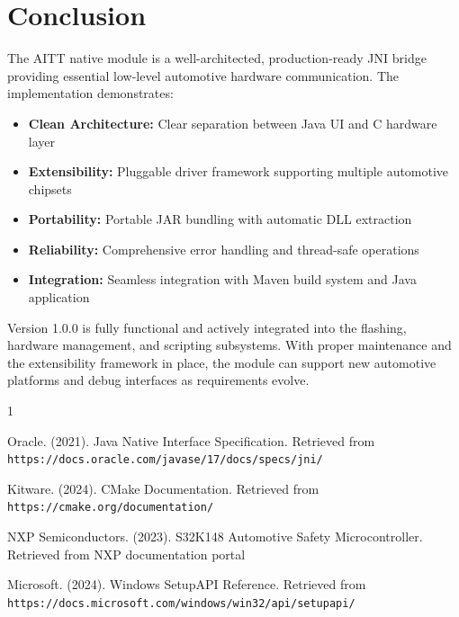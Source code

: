 \documentclass[12pt,a4paper]{article}
\begin{document}
\newpage

\section{Conclusion}

The AITT native module is a well-architected, production-ready JNI bridge providing essential low-level automotive hardware communication. The implementation demonstrates:

\begin{itemize}
    \item \textbf{Clean Architecture:} Clear separation between Java UI and C hardware layer
    \item \textbf{Extensibility:} Pluggable driver framework supporting multiple automotive chipsets
    \item \textbf{Portability:} Portable JAR bundling with automatic DLL extraction
    \item \textbf{Reliability:} Comprehensive error handling and thread-safe operations
    \item \textbf{Integration:} Seamless integration with Maven build system and Java application
\end{itemize}

Version 1.0.0 is fully functional and actively integrated into the flashing, hardware management, and scripting subsystems. With proper maintenance and the extensibility framework in place, the module can support new automotive platforms and debug interfaces as requirements evolve.

\newpage

\begin{thebibliography}{1}

 Oracle. (2021). Java Native Interface Specification. Retrieved from \texttt{https://docs.oracle.com/javase/17/docs/specs/jni/}

 Kitware. (2024). CMake Documentation. Retrieved from \texttt{https://cmake.org/documentation/}

 NXP Semiconductors. (2023). S32K148 Automotive Safety Microcontroller. Retrieved from NXP documentation portal

 Microsoft. (2024). Windows SetupAPI Reference. Retrieved from \texttt{https://docs.microsoft.com/windows/win32/api/setupapi/}

\end{thebibliography}
\end{document}
